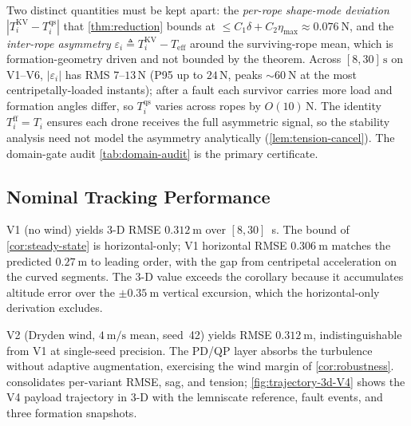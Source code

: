 Two distinct quantities must be kept apart: the \emph{per-rope shape-mode deviation} $|T_i^{\mathrm{KV}}-T_i^{\mathrm{qs}}|$ that \cref{thm:reduction} bounds at $\le C_1\delta+C_2\eta_{\max}\approx\SI{0.076}{\newton}$, and the \emph{inter-rope asymmetry} $\varepsilon_i\triangleq T_i^{\mathrm{KV}}-T_{\mathrm{eff}}$ around the surviving-rope mean, which is formation-geometry driven and not bounded by the theorem. Across $[8,30]\,\si{\second}$ on V1--V6, $|\varepsilon_i|$ has RMS $7$--$13$\,N (P95 up to $24$\,N, peaks $\sim\SI{60}{\newton}$ at the most centripetally-loaded instants); after a fault each survivor carries more load and formation angles differ, so $T_i^{\mathrm{qs}}$ varies across ropes by $O(10)$\,N. The identity $T_i^{\mathrm{ff}}=T_i$ ensures each drone receives the full asymmetric signal, so the stability analysis need not model the asymmetry analytically (\cref{lem:tension-cancel}). The domain-gate audit \cref{tab:domain-audit} is the primary certificate.

\subsection{Nominal Tracking Performance}
\label{sec:VI-B}

V1 (no wind) yields 3-D RMSE $\SI{0.312}{\metre}$ over $[8,30]$~s. The bound of \cref{cor:steady-state} is horizontal-only; V1 horizontal RMSE $\SI{0.306}{\metre}$ matches the predicted $\SI{0.27}{\metre}$ to leading order, with the gap from centripetal acceleration on the curved segments. The 3-D value exceeds the corollary because it accumulates altitude error over the $\pm\SI{0.35}{\metre}$ vertical excursion, which the horizontal-only derivation excludes.

V2 (Dryden wind, $\SI{4}{\metre\per\second}$ mean, seed~42) yields RMSE $\SI{0.312}{\metre}$, indistinguishable from V1 at single-seed precision. The PD/QP layer absorbs the turbulence without adaptive augmentation, exercising the wind margin of \cref{cor:robustness}.  consolidates per-variant RMSE, sag, and tension; \cref{fig:trajectory-3d-V4} shows the V4 payload trajectory in 3-D with the lemniscate reference, fault events, and three formation snapshots.


